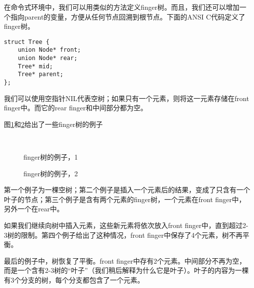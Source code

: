 \documentclass[UTF8]{article}
\begin{document}
在命令式环境中，我们可以用类似的方法定义finger树。而且，我们还可以增加一个指向parent的变量，方便从任何节点回溯到根节点。下面的ANSI C代码定义了finger树。

\lstset{language=C}
\begin{lstlisting}
struct Tree {
    union Node* front;
    union Node* rear;
    Tree* mid;
    Tree* parent;
};
\end{lstlisting}

我们可以使用空指针NIL代表空树；如果只有一个元素，则将这一元素存储在front finger中。而它的rear finger和中间部分都为空。

图\ref{fig:ftr-example-1}和\ref{fig:ftr-example-2}给出了一些finger树的例子

\begin{figure}[htbp]
  \centering
   \\
  \caption{finger树的例子，1} \label{fig:ftr-example-1}
\end{figure}

\begin{figure}[htbp]
  \centering
  \hspace{0.2\textwidth}
  \caption{finger树的例子，2} \label{fig:ftr-example-2}
\end{figure}

第一个例子为一棵空树；第二个例子是插入一个元素后的结果，变成了只含有一个叶子的节点；第三个例子是含有两个元素的finger树，一个元素在front finger中，另外一个在rear中。

如果我们继续向树中插入元素，这些新元素将依次放入front finger中，直到超过2-3树的限制。第四个例子给出了这种情况，front finger中保存了4个元素，树不再平衡。

最后的例子中，树恢复了平衡。front finger中存有2个元素。中间部分不再为空，而是一个含有2-3树的“叶子”（我们稍后解释为什么它是叶子）。叶子的内容为一棵有3个分支的树，每个分支都包含了一个元素。
\end{document}
